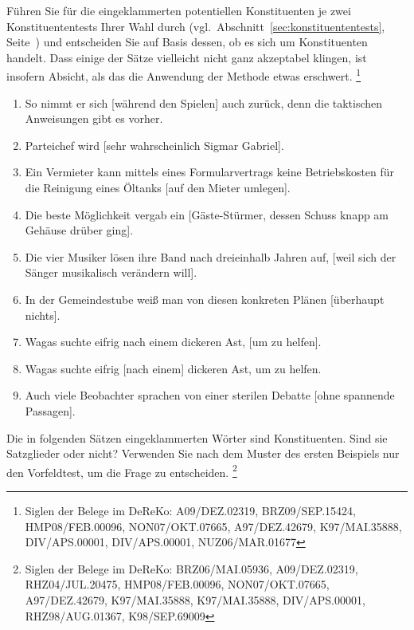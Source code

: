 \Uebungen

 \label{exc:konstituentenstruktur01} Führen Sie für die eingeklammerten potentiellen Konstituenten je zwei Konstituententests Ihrer Wahl durch (vgl.\ Abschnitt~\ref{sec:konstituententests}, Seite~\pageref{sec:konstituententests}) und entscheiden Sie auf Basis dessen, ob es sich um Konstituenten handelt.
Dass einige der Sätze vielleicht nicht ganz akzeptabel klingen, ist insofern Absicht, als das die Anwendung der Methode etwas erschwert.%
\footnote{Siglen der Belege im DeReKo: A09\slash DEZ.02319, BRZ09\slash SEP.15424, HMP08\slash FEB.00096, NON07\slash OKT.07665, A97\slash DEZ.42679, K97\slash MAI.35888, DIV\slash APS.00001, DIV\slash APS.00001, NUZ06\slash MAR.01677}

\begin{enumerate}
  \item So nimmt er sich [während den Spielen] auch zurück, denn die taktischen Anweisungen gibt es vorher.
  \item Parteichef wird [sehr wahrscheinlich Sigmar Gabriel].
  \item Ein Vermieter kann mittels eines Formularvertrags keine Betriebskosten für die Reinigung eines Öltanks [auf den Mieter umlegen].
  \item Die beste Möglichkeit vergab ein [Gäste-Stürmer, dessen Schuss knapp am Gehäuse drüber ging].
  \item Die vier Musiker lösen ihre Band nach dreieinhalb Jahren auf, [weil sich der Sänger musikalisch verändern will].
  \item In der Gemeindestube weiß man von diesen konkreten Plänen [überhaupt nichts].
  \item Wagas suchte eifrig nach einem dickeren Ast, [um zu helfen].
  \item Wagas suchte eifrig [nach einem] dickeren Ast, um zu helfen.
  \item Auch viele Beobachter sprachen von einer sterilen Debatte [ohne spannende Passagen].
\end{enumerate}

 \label{exc:konstituentenstruktur02} Die in folgenden Sätzen eingeklammerten Wörter sind Konstituenten.
Sind sie Satzglieder oder nicht?
Verwenden Sie nach dem Muster des ersten Beispiels nur den Vorfeldtest, um die Frage zu entscheiden.%
\footnote{Siglen der Belege im DeReKo: BRZ06\slash MAI.05936, A09\slash DEZ.02319, RHZ04\slash JUL.20475, HMP08\slash FEB.00096, NON07\slash OKT.07665, A97\slash DEZ.42679, K97\slash MAI.35888, K97\slash MAI.35888, DIV\slash APS.00001, RHZ98\slash AUG.01367, K98\slash SEP.69009}

